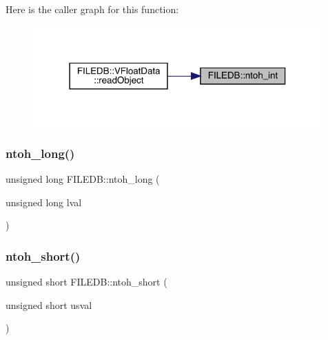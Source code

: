 Here is the caller graph for this function\+:\nopagebreak
\begin{figure}[H]
\begin{center}
\leavevmode
\includegraphics[width=315pt]{d2/de6/namespaceFILEDB_ab34ff6954f1b3a0dc868119d34105579_icgraph}
\end{center}
\end{figure}
\mbox{\label{namespaceFILEDB_af2fbdeeb7148fa47d1050b1ac3130897}} 
\subsubsection{\texorpdfstring{ntoh\_long()}{ntoh\_long()}}
{\footnotesize\ttfamily unsigned long F\+I\+L\+E\+D\+B\+::ntoh\+\_\+long (\begin{DoxyParamCaption}\item[{unsigned long}]{lval }\end{DoxyParamCaption})}

\mbox{\label{namespaceFILEDB_af28aef063f95fcb331d3844f6807daf5}} 
\subsubsection{\texorpdfstring{ntoh\_short()}{ntoh\_short()}}
{\footnotesize\ttfamily unsigned short F\+I\+L\+E\+D\+B\+::ntoh\+\_\+short (\begin{DoxyParamCaption}\item[{unsigned short}]{usval }\end{DoxyParamCaption})}

